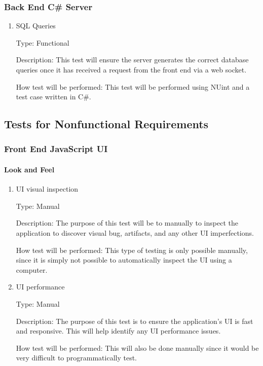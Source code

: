 \documentclass[12pt, titlepage]{article}
\begin{document}
\subsubsection{Back End C\# Server}

\begin{enumerate}

\item{SQL Queries\\}

Type: Functional
					
Description: This test will ensure the server generates the correct database
queries once it has received a request from the front end via a web socket.

How test will be performed: This test will be performed using NUint and a test
case written in C\#.

\end{enumerate}

\subsection{Tests for Nonfunctional Requirements}

\subsubsection{Front End JavaScript UI}
		
\paragraph{Look and Feel}

\begin{enumerate}

\item{UI visual inspection\\}

Type: Manual

Description: The purpose of this test will be to manually to inspect the application to
discover visual bug, artifacts, and any other UI imperfections.

How test will be performed: This type of testing is only possible manually,
since it is simply not possible to automatically inspect the UI using a
computer.
					
\item{UI performance\\}

Type: Manual

Description: The purpose of this test is to ensure the application's UI
is fast and responsive. This will help identify any UI performance issues.

How test will be performed: This will also be done manually since it would
be very difficult to programmatically test.

\end{enumerate}
\end{document}

